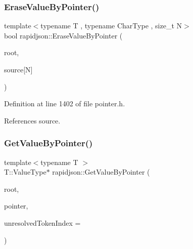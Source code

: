 \subsubsection{\texorpdfstring{EraseValueByPointer()}{EraseValueByPointer()}\hspace{0.1cm}{\footnotesize\ttfamily [2/2]}}
{\footnotesize\ttfamily template$<$typename T , typename Char\+Type , size\+\_\+t N$>$ \\
bool rapidjson\+::\+Erase\+Value\+By\+Pointer (\begin{DoxyParamCaption}\item[{T \&}]{root,  }\item[{const Char\+Type(\&)}]{source\mbox{[}\+N\mbox{]} }\end{DoxyParamCaption})}



Definition at line 1402 of file pointer.\+h.


\begin{DoxyCode}{0}

\end{DoxyCode}


References source.

\mbox{\label{namespacerapidjson_a1e54debf2cebf89b4e810cb9a22bfa3b}} 
\subsubsection{\texorpdfstring{GetValueByPointer()}{GetValueByPointer()}\hspace{0.1cm}{\footnotesize\ttfamily [1/4]}}
{\footnotesize\ttfamily template$<$typename T $>$ \\
T\+::\+Value\+Type$\ast$ rapidjson\+::\+Get\+Value\+By\+Pointer (\begin{DoxyParamCaption}\item[{T \&}]{root,  }\item[{const \mbox{\hyperlink{classrapidjson_1_1_generic_pointer}{Generic\+Pointer}}$<$ typename T\+::\+Value\+Type $>$ \&}]{pointer,  }\item[{size\+\_\+t $\ast$}]{unresolved\+Token\+Index = {} }\end{DoxyParamCaption})}



